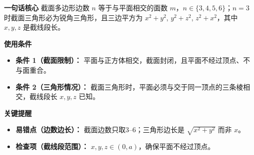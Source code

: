 \begin{summarybox}
	\textbf{\textcolor{CSummary}{一句话核心}}
	截面多边形边数 $n$ 等于与平面相交的面数 $m$，$n\in\{3,4,5,6\}$；$n=3$ 时截面三角形必为锐角三角形，且三边平方为 $x^2+y^2$, $y^2+z^2$, $z^2+x^2$，其中 $x,y,z$ 是截线段长。

	\medskip
	\textbf{\textcolor{CSummary}{使用条件}}
	\begin{itemize}[leftmargin=*, itemsep=0.5em, topsep=0.4em]
		\item \textbf{条件 1（截面限制）：} 平面与正方体相交，截面封闭，且平面不经过顶点、不与面重合。
		\item \textbf{条件 2（三角形情况）：} 截面三角形时，平面必须与交于同一顶点的三条棱相交，截线段长 $x,y,z$ 已知。
	\end{itemize}

	\medskip
	\textbf{\textcolor{CSummary}{关键提醒}}
	\begin{itemize}[leftmargin=*, itemsep=0.5em, topsep=0.4em]
		\item \textbf{易错点（边数边长）：} 截面边数只取3--6；三角形边长是 $\sqrt{x^2+y^2}$ 而非 $x$。
		\item \textbf{检查项（截线段范围）：} $x,y,z\in(0,a)$，确保平面不经过顶点。
	\end{itemize}

\end{summarybox}
